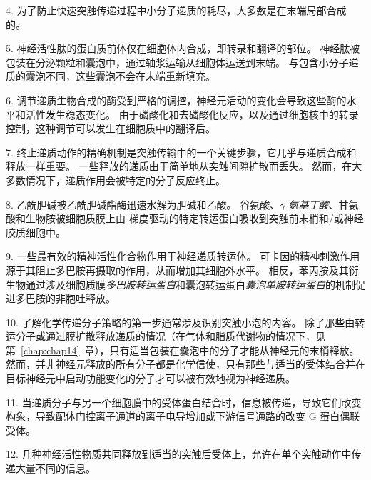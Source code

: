4. 为了防止快速突触传递过程中小分子递质的耗尽，大多数是在末端局部合成的。


5. 神经活性肽的蛋白质前体仅在细胞体内合成，即转录和翻译的部位。
神经肽被包装在分泌颗粒和囊泡中，通过轴浆运输从细胞体运送到末端。
与包含小分子递质的囊泡不同，这些囊泡不会在末端重新填充。 


6. 调节递质生物合成的酶受到严格的调控，神经元活动的变化会导致这些酶的水平和活性发生稳态变化。
由于磷酸化和去磷酸化反应，以及通过细胞核中的转录控制，这种调节可以发生在细胞质中的翻译后。 


7. 终止递质动作的精确机制是突触传输中的一个关键步骤，它几乎与递质合成和释放一样重要。
一些释放的递质由于简单地从突触间隙扩散而丢失。
然而，在大多数情况下，递质作用会被特定的分子反应终止。 


8. 乙酰胆碱被乙酰胆碱酯酶迅速水解为胆碱和乙酸。
谷氨酸、\textit{$\gamma$-氨基丁酸}、甘氨酸和生物胺被细胞质膜上由  梯度驱动的特定转运蛋白吸收到突触前末梢和/或神经胶质细胞中。


9. 一些最有效的精神活性化合物作用于神经递质转运体。
可卡因的精神刺激作用源于其阻止多巴胺再摄取的作用，从而增加其细胞外水平。
相反，苯丙胺及其衍生物通过涉及细胞质膜\textit{多巴胺转运蛋白}和囊泡转运蛋白\textit{囊泡单胺转运蛋白}的机制促进多巴胺的非胞吐释放。


10. 了解化学传递分子策略的第一步通常涉及识别突触小泡的内容。
除了那些由转运分子或通过膜扩散释放递质的情况（在气体和脂质代谢物的情况下，见第~\ref{chap:chap14}~章），只有适当包装在囊泡中的分子才能从神经元的末梢释放。
然而，并非神经元释放的所有分子都是化学信使，只有那些与适当的受体结合并在目标神经元中启动功能变化的分子才可以被有效地视为神经递质。 


11. 当递质分子与另一个细胞膜中的受体蛋白结合时，信息被传递，导致它们改变构象，导致配体门控离子通道的离子电导增加或下游信号通路的改变 G 蛋白偶联受体。 


12. 几种神经活性物质共同释放到适当的突触后受体上，允许在单个突触动作中传递大量不同的信息。


